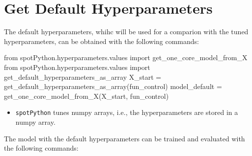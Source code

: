 \documentclass[
  letterpaper,
  DIV=11,
  numbers=noendperiod]{scrreprt}
\newenvironment{Shaded}{\begin{snugshade}}{\end{snugshade}}
\newcommand{\ImportTok}[1]{\textcolor[rgb]{0.00,0.46,0.62}{#1}}
\newcommand{\NormalTok}[1]{\textcolor[rgb]{0.00,0.23,0.31}{#1}}
\newcommand{\OperatorTok}[1]{\textcolor[rgb]{0.37,0.37,0.37}{#1}}
\providecommand{\tightlist}{%
  \setlength{\itemsep}{0pt}\setlength{\parskip}{0pt}}\usepackage{longtable,booktabs,array}
\begin{document}
\section{Get Default Hyperparameters}\label{get-default-hyperparameters}

The default hyperparameters, whihc will be used for a comparion with the
tuned hyperparameters, can be obtained with the following commands:

\begin{Shaded}
\begin{Highlighting}[]
\ImportTok{from}\NormalTok{ spotPython.hyperparameters.values }\ImportTok{import}\NormalTok{ get\_one\_core\_model\_from\_X}
\ImportTok{from}\NormalTok{ spotPython.hyperparameters.values }\ImportTok{import}\NormalTok{ get\_default\_hyperparameters\_as\_array}
\NormalTok{X\_start }\OperatorTok{=}\NormalTok{ get\_default\_hyperparameters\_as\_array(fun\_control)}
\NormalTok{model\_default }\OperatorTok{=}\NormalTok{ get\_one\_core\_model\_from\_X(X\_start, fun\_control)}
\end{Highlighting}
\end{Shaded}

\begin{tcolorbox}[enhanced jigsaw, rightrule=.15mm, coltitle=black, title=\textcolor{quarto-callout-note-color}{\faInfo}\hspace{0.5em}{Note: \texttt{spotPython} tunes numpy arrays}, opacitybacktitle=0.6, bottomrule=.15mm, opacityback=0, left=2mm, colback=white, leftrule=.75mm, colframe=quarto-callout-note-color-frame, colbacktitle=quarto-callout-note-color!10!white, toprule=.15mm, toptitle=1mm, bottomtitle=1mm, titlerule=0mm, breakable, arc=.35mm]

\begin{itemize}
\tightlist
\item
  \texttt{spotPython} tunes numpy arrays, i.e., the hyperparameters are
  stored in a numpy array.
\end{itemize}

\end{tcolorbox}

The model with the default hyperparameters can be trained and evaluated
with the following commands:
\end{document}
